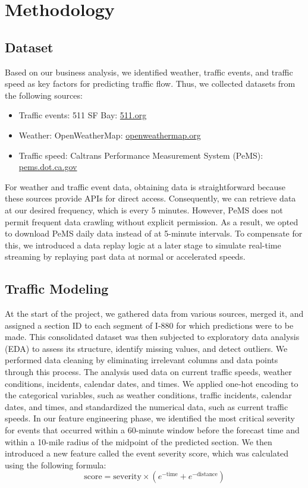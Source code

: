 \newpage

\section{Methodology}


\subsection{Dataset}
Based on our business analysis, we identified weather, traffic events, and traffic speed as key factors for predicting traffic flow. Thus, we collected datasets from the following sources:
\begin{itemize}
    \item Traffic events: 511 SF Bay: \url{511.org}
    \item Weather: OpenWeatherMap: \url{openweathermap.org}
    \item Traffic speed: Caltrans Performance Measurement System (PeMS): \url{pems.dot.ca.gov}
\end{itemize}

For weather and traffic event data, obtaining data is straightforward because these sources provide APIs for direct access. Consequently, we can retrieve data at our desired frequency, which is every 5 minutes. However, PeMS does not permit frequent data crawling without explicit permission. As a result, we opted to download PeMS daily data instead of at 5-minute intervals. To compensate for this, we introduced a data replay logic at a later stage to simulate real-time streaming by replaying past data at normal or accelerated speeds.

\subsection{Traffic Modeling}
At the start of the project, we gathered data from various sources, merged it, and assigned a section ID to each segment of I-880 for which predictions were to be made. This consolidated dataset was then subjected to exploratory data analysis (EDA) to assess its structure, identify missing values, and detect outliers. We performed data cleaning by eliminating irrelevant columns and data points through this process. The analysis used data on current traffic speeds, weather conditions, incidents, calendar dates, and times. We applied one-hot encoding to the categorical variables, such as weather conditions, traffic incidents, calendar dates, and times, and standardized the numerical data, such as current traffic speeds.
In our feature engineering phase, we identified the most critical severity for events that occurred within a 60-minute window before the forecast time and within a 10-mile radius of the midpoint of the predicted section. We then introduced a new feature called the event severity score, which was calculated using the following formula:
\begin{equation}
    \text{score} = \text{severity} \times \left( e^{-\text{time}} + e^{-\text{distance}} \right)
\end{equation}


